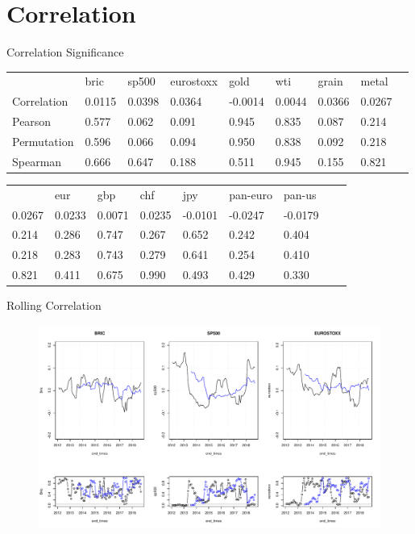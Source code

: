 \documentclass{beamer}
\begin{document}
\section{Correlation}
\begin{frame}{Correlation Significance}
\begin{table}[]
\begin{tabular}{lllllllll}
&bric	&sp500	&eurostoxx	&gold	&wti	&grain	&metal\\
Correlation &0.0115	&0.0398	&0.0364	&-0.0014	&0.0044	&0.0366	&0.0267\\
Pearson &0.577	&0.062	&0.091	&0.945	&0.835	&0.087	&0.214\\
Permutation &0.596	&0.066	&0.094	&0.950	&0.838	&0.092	&0.218\\
Spearman &0.666	&0.647	&0.188	&0.511	&0.945	&0.155	&0.821\\
\end{tabular}
\end{table} 

\begin{table}[]
\begin{tabular}{lllllllll}
&eur	&gbp	&chf	&jpy	&pan-euro	&pan-us\\
0.0267 &0.0233	&0.0071	&0.0235	&-0.0101	&-0.0247	&-0.0179\\
0.214 &0.286	&0.747	&0.267	&0.652	&0.242	&0.404\\
0.218 &0.283	&0.743	&0.279	&0.641	&0.254	&0.410\\
0.821 &0.411	&0.675	&0.990	&0.493	&0.429	&0.330\\
\end{tabular}
\end{table} 
\end{frame}


\begin{frame}{Rolling Correlation}
\begin{figure}
\includegraphics[width=\textwidth]{rolling_stocks.pdf}
\label{roll_stocks}
\end{figure}
\end{frame}
\end{document}
